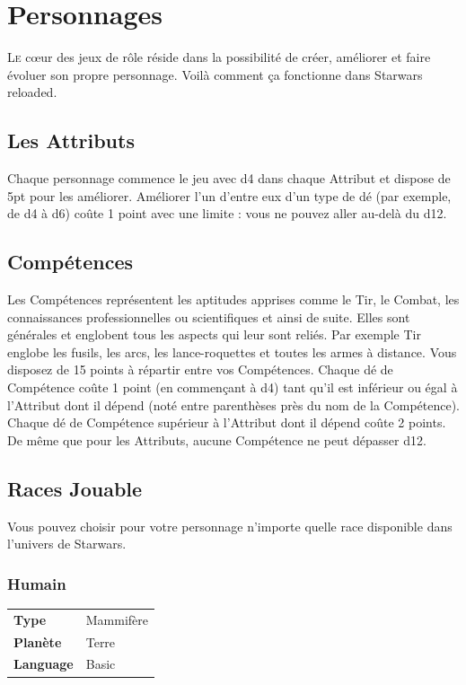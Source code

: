 
\section{Personnages}
\lettrine{L}{e} c\oe{}ur des jeux de rôle réside dans la possibilité de créer, améliorer et faire évoluer son propre personnage. Voilà comment ça fonctionne dans {\jedifont Starwars reloaded}. 

\subsection{Les Attributs}
Chaque personnage commence le jeu avec d4 dans chaque Attribut et dispose de 5pt pour les améliorer. Améliorer l'un d'entre eux d’un type de dé (par exemple, de d4 à d6) coûte 1 point avec une limite : vous ne pouvez aller au-delà du d12.

\subsection{Compétences}
Les Compétences représentent les aptitudes apprises comme le Tir, le Combat, les connaissances professionnelles ou scientifiques et ainsi de suite. Elles sont générales et englobent tous les aspects qui leur sont reliés. Par exemple Tir englobe les fusils, les arcs, les lance-roquettes et toutes les armes à distance. Vous disposez de 15 points à répartir entre vos Compétences. Chaque dé de Compétence coûte 1 point (en commençant à d4) tant qu’il est inférieur ou égal à l’Attribut dont il dépend (noté entre parenthèses près du nom de la Compétence). Chaque dé de Compétence supérieur à l’Attribut dont il dépend coûte 2 points. De même que pour les Attributs, aucune Compétence ne peut dépasser d12.

\subsection{Races Jouable}
Vous pouvez choisir pour votre personnage n’importe quelle race disponible dans l'univers de Starwars. 

\newpage
\subsubsection{Humain}
\begin{flushright}
\begin{tabular}{ l l }
	\textbf{Type} & Mammifère \\
   	\textbf{Planète} & Terre \\
   	\textbf{Language} & Basic \\
\end{tabular}
\vspace{-60}
\end{flushright}



